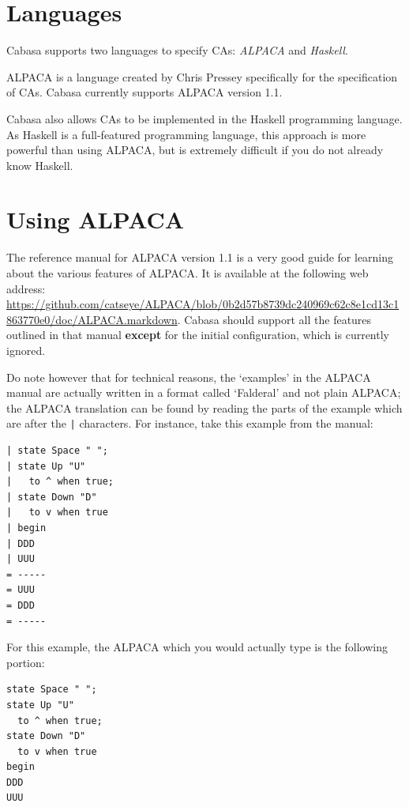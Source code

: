 \documentclass[oneside,a4paper]{memoir}
\begin{document}
\section{Languages}
\label{sec:speclangs}

Cabasa supports two languages to specify CAs: \emph{ALPACA} and \emph{Haskell}.

ALPACA is a language created by Chris Pressey specifically for the specification of CAs.
Cabasa currently supports ALPACA version 1.1.

Cabasa also allows CAs to be implemented in the Haskell programming language.
As Haskell is a full-featured programming language, this approach is more powerful than using ALPACA,
  but is extremely difficult if you do not already know Haskell.

\section{Using ALPACA}
\label{sec:usalp}

The reference manual for ALPACA version 1.1 is a very good guide for learning about the various features of ALPACA.
It is available at the following web address: \url{https://github.com/catseye/ALPACA/blob/0b2d57b8739dc240969c62c8e1cd13c1863770e0/doc/ALPACA.markdown}.
Cabasa should support all the features outlined in that manual
  \textbf{except} for the initial configuration, which is currently ignored.

Do note however that for technical reasons\footnotemark,
  the `examples' in the ALPACA manual are actually written in a format called `Falderal' and not plain ALPACA;
  the ALPACA translation can be found by reading the parts of the example which are after the \texttt{|} characters.
For instance, take this example from the manual:

\begin{verbatim}
| state Space " ";
| state Up "U"
|   to ^ when true;
| state Down "D"
|   to v when true
| begin
| DDD
| UUU
= -----
= UUU
= DDD
= -----
\end{verbatim}

For this example, the ALPACA which you would actually type is the following portion:

\begin{verbatim}
state Space " ";
state Up "U"
  to ^ when true;
state Down "D"
  to v when true
begin
DDD
UUU
\end{verbatim}

\end{document}
